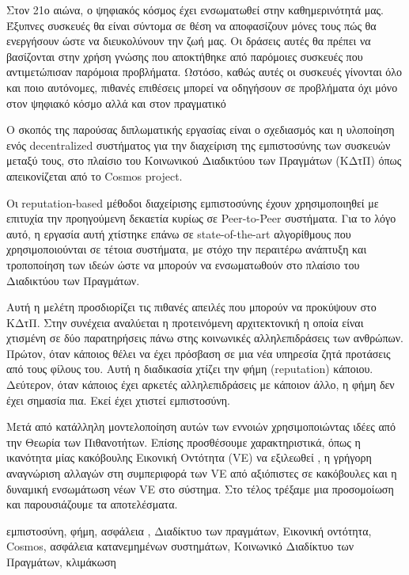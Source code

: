 \begin{abstractgr}
Στον 21ο αιώνα, ο ψηφιακός κόσμος έχει ενσωματωθεί στην καθημερινότητά μας. Έξυπνες συσκευές θα είναι σύντομα σε θέση να αποφασίζουν μόνες τους πώς θα ενεργήσουν ώστε να διευκολύνουν την ζωή μας.
Οι δράσεις αυτές θα πρέπει να βασίζονται στην χρήση γνώσης που αποκτήθηκε  από παρόμοιες συσκευές που αντιμετώπισαν    παρόμοια προβλήματα. Ωστόσο, καθώς αυτές οι συσκευές γίνονται όλο και ποιο αυτόνομες,
πιθανές επιθέσεις μπορεί να οδηγήσουν σε προβλήματα όχι μόνο στον ψηφιακό κόσμο αλλά και στον πραγματικό

Ο σκοπός της παρούσας διπλωματικής εργασίας είναι ο σχεδιασμός και η υλοποίηση ενός decentralized συστήματος για την διαχείριση της εμπιστοσύνης των συσκευών μεταξύ τους, στο πλαίσιο του
Κοινωνικού Διαδικτύου των Πραγμάτων (ΚΔτΠ)
 όπως απεικονίζεται από το Cosmos project.
 
Οι reputation-based μέθοδοι διαχείρισης εμπιστοσύνης έχουν χρησιμοποιηθεί με επιτυχία την προηγούμενη
δεκαετία κυρίως σε Peer-to-Peer συστήματα. Για το λόγο αυτό, η εργασία αυτή χτίστηκε επάνω σε 
state-of-the-art αλγορίθμους που χρησιμοποιούνται σε τέτοια συστήματα, με στόχο την περαιτέρω ανάπτυξη και τροποποίηση των
ιδεών ώστε να μπορούν να ενσωματωθούν στο πλαίσιο του Διαδικτύου των Πραγμάτων.
 
Αυτή η μελέτη προσδιορίζει τις πιθανές απειλές που μπορούν να προκύψουν στο ΚΔτΠ. Στην συνέχεια αναλύεται η προτεινόμενη αρχιτεκτονική η οποία είναι χτισμένη σε δύο παρατηρήσεις πάνω στης κοινωνικές αλληλεπιδράσεις των ανθρώπων.
 Πρώτον, όταν κάποιος θέλει να έχει πρόσβαση σε μια νέα υπηρεσία  ζητά προτάσεις από
τους φίλους του. Αυτή η διαδικασία χτίζει την φήμη (reputation) κάποιου. Δεύτερον, όταν κάποιος έχει αρκετές
αλληλεπιδράσεις με κάποιον άλλο, η φήμη δεν έχει σημασία πια. Εκεί έχει χτιστεί εμπιστοσύνη.
 
Μετά από κατάλληλη μοντελοποίηση αυτών των εννοιών χρησιμοποιώντας ιδέες από την Θεωρία των Πιθανοτήτων. Επίσης προσθέσουμε χαρακτηριστικά, όπως
η ικανότητα μίας κακόβουλης Εικονική Οντότητα (VE) να εξιλεωθεί , η γρήγορη αναγνώριση 
αλλαγών στη συμπεριφορά των VE από αξιόπιστες σε κακόβουλες και η δυναμική ενσωμάτωση 
νέων VE στο σύστημα. Στο τέλος τρέξαμε μια προσομοίωση και παρουσιάζουμε τα αποτελέσματα.
	
    \begin{keywordsgr}
   εμπιστοσύνη, φήμη, ασφάλεια , Διαδίκτυο των πραγμάτων, Εικονική οντότητα, Cosmos, ασφάλεια κατανεμημένων συστημάτων, Κοινωνικό Διαδίκτυο των Πραγμάτων, κλιμάκωση
	\end{keywordsgr}
	
	
\end{abstractgr}

